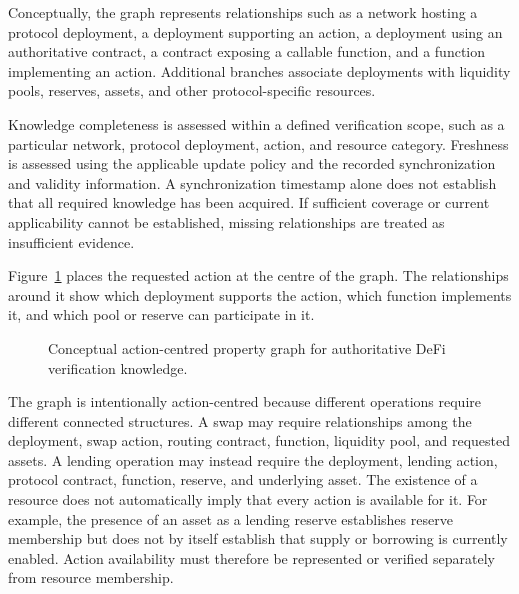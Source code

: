 Conceptually, the graph represents relationships such as a network hosting a
protocol deployment, a deployment supporting an action, a deployment using an
authoritative contract, a contract exposing a callable function, and a function
implementing an action. Additional branches associate deployments with
liquidity pools, reserves, assets, and other protocol-specific resources.

Knowledge completeness is assessed within a defined verification scope,
such as a particular network, protocol deployment, action, and resource
category. Freshness is assessed using the applicable update policy and
the recorded synchronization and validity information. A synchronization
timestamp alone does not establish that all required knowledge has been
acquired. If sufficient coverage or current applicability cannot be
established, missing relationships are treated as insufficient evidence.

Figure~\ref{fig:conceptual_graph_model} places the requested action at the
centre of the graph. The relationships around it show which deployment
supports the action, which function implements it, and which pool or
reserve can participate in it.


\begin{figure}[H]
    \centering
    \resizebox{0.95\textwidth}{!}{%
    }
    \caption{Conceptual action-centred property graph for authoritative
    DeFi verification knowledge.}
    \label{fig:conceptual_graph_model}
\end{figure}

The graph is intentionally action-centred because different operations require
different connected structures. A swap may require relationships among the
deployment, swap action, routing contract, function, liquidity pool, and
requested assets. A lending operation may instead require the deployment,
lending action, protocol contract, function, reserve, and underlying asset. The existence of a resource does not automatically imply that every action is
available for it. For example, the presence of an asset as a lending reserve
establishes reserve membership but does not by itself establish that supply or
borrowing is currently enabled. Action availability must therefore be
represented or verified separately from resource membership.

